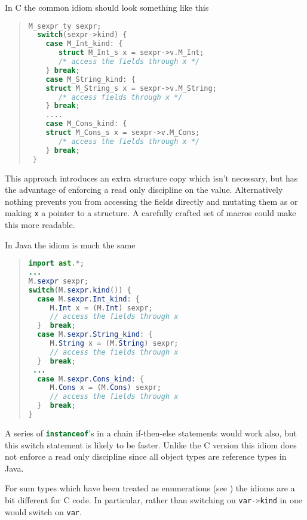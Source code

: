 In C the common idiom should look something like this
\begin{quote}\begin{lstlisting}[language=c]
 M_sexpr_ty sexpr;
  switch(sexpr->kind) {
    case M_Int_kind: {
       struct M_Int_s x = sexpr->v.M_Int;
       /* access the fields through x */
    } break;
    case M_String_kind: {
	struct M_String_s x = sexpr->v.M_String;
       /* access fields through x */
    } break;
    ....
    case M_Cons_kind: {
	struct M_Cons_s x = sexpr->v.M_Cons;
       /* access the fields through x */
    } break;
 } 
\end{lstlisting}\end{quote}%

This approach introduces an extra structure copy which isn't necessary, but
has the advantage of enforcing a read only discipline on the
value. Alternatively nothing prevents you from accessing the fields directly
and mutating them as or making \lstinline!x! a pointer to a structure. A
carefully crafted set of macros could make this more readable.

In Java the idiom is much the same
\begin{quote}\begin{lstlisting}[language=java]
import ast.*;
...
M.sexpr sexpr;
switch(M.sexpr.kind()) {
  case M.sexpr.Int_kind: {
     M.Int x = (M.Int) sexpr;
     // access the fields through x
  }  break;
  case M.sexpr.String_kind: {
     M.String x = (M.String) sexpr;
     // access the fields through x
  }  break;
 ...
  case M.sexpr.Cons_kind: {
     M.Cons x = (M.Cons) sexpr;
     // access the fields through x
  }  break;
} 
\end{lstlisting}\end{quote}%
A series of \lstinline[language=java]!instanceof!'s in a chain if-then-else
statements would work also, but
this switch statement is likely to be faster. Unlike the C version this
idiom does not enforce a read only discipline since all object types are
reference types in Java.

For sum types which have been treated as enumerations (see )
the idioms are a bit different for C code.
In particular, rather than switching on \lstinline[language=c]!var->kind! in one would
switch on \lstinline[language=c]!var!. 

